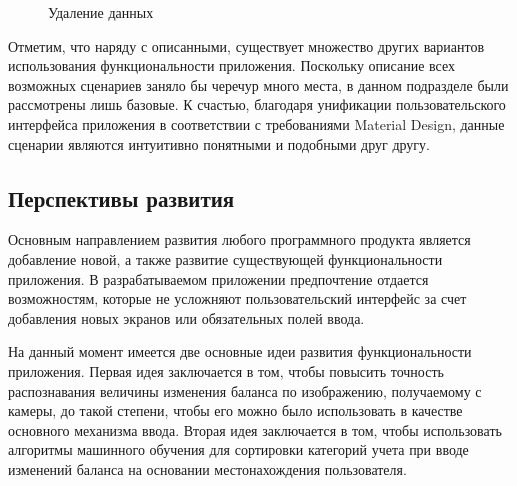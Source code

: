 \begin{figure}[h!]
  \centering
  \caption{Удаление данных}
  \label{fig:implementation_manual_remove}
\end{figure}

Отметим, что наряду с описанными, существует множество других вариантов
использования функциональности приложения.
Поскольку описание всех возможных сценариев заняло бы
черечур много места, в данном подразделе были рассмотрены лишь базовые.
К счастью, благодаря унификации пользовательского интерфейса приложения
в соответствии с требованиями Material Design, данные сценарии являются
интуитивно понятными и подобными друг другу.

\subsection{Перспективы развития}

Основным направлением развития любого программного продукта является
добавление новой, а также развитие существующей функциональности приложения.
В разрабатываемом приложении предпочтение отдается возможностям,
которые не усложняют пользовательский интерфейс за счет добавления новых экранов
или обязательных полей ввода.

На данный момент имеется две основные идеи развития функциональности приложения.
Первая идея заключается в том, чтобы повысить точность распознавания величины
изменения баланса по изображению, получаемому с камеры, до такой степени, чтобы
его можно было использовать в качестве основного механизма ввода.
Вторая идея заключается в том, чтобы использовать алгоритмы машинного обучения
для сортировки категорий учета при вводе изменений баланса на основании
местонахождения пользователя.
